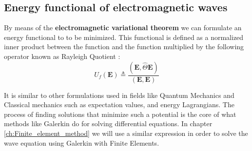  \subsection{Energy functional of electromagnetic waves}
 
By means of the \textbf{electromagnetic variational theorem} we can formulate an energy functional to  to be minimized. This functional is defined as a normalized inner product between the function and the function multiplied by the following operator known as Rayleigh Quotient :
\begin{equation}
U_f(\mathbf{E}) \triangleq \frac{\left(\mathbf{E}, \hat{\Theta} \mathbf{E}\right)}{\left(\mathbf{E},\mathbf{E}\right)}
\label{eq:energy_functional}
\end{equation}

It is similar to other formulations used in fields like Quantum Mechanics and Classical mechanics such as expectation values, and energy Lagrangians.  The process of finding solutions that minimize such a potential is the core of what methods like Galerkin do for solving differential equations. In chapter \ref{ch:Finite_element_method} we will use a similar expression in order to solve the wave equation using Galerkin with Finite Elements.
 